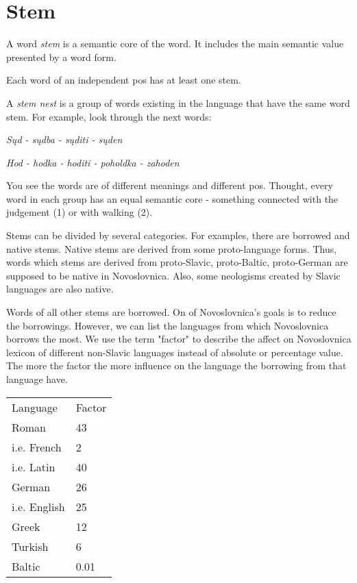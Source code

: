 \section{Stem}

A word \textit{stem} is a semantic core of the word. It includes the main semantic value presented by a word form.

Each word of an independent \gls{pos} has at least one stem.

A \textit{stem nest} is a group of words existing in the language that have the same word stem. For example, look through the next words:

\textit{Sųd - sųdba - sųditi - sųden}

\textit{Hod - hodka - hoditi - poholdka - zahoden}

You see the words are of different meanings and different \gls{pos}. Thought, every word in each group has an equal semantic core - something connected with the judgement (1) or with walking (2).

Stems can be divided by several categories. For examples, there are borrowed and native stems. Native stems are derived from some proto-language forms. Thus, words which stems are derived from proto-Slavic, proto-Baltic, proto-German are supposed to be native in Novoslovnica. Also, some neologisms created by Slavic languages are also native.

Words of all other stems are borrowed. On of Novoslovnica's goals is to reduce the borrowings. However, we can list the languages from which Novoslovnica borrows the most. We use the term "factor" to describe the affect on Novoslovnica lexicon of different non-Slavic languages instead of absolute or percentage value. The more the factor the more influence on the language the borrowing from that language have.

\begin{table}[!htb]
	\begin{tabular}{ll}
		Language & Factor \\
		Roman & 43 \\
		i.e. French & 2 \\
		i.e. Latin & 40 \\
		German & 26 \\
		i.e. English & 25 \\
		Greek & 12 \\ 
		Turkish & 6 \\
		Baltic & 0.01 \\
	\end{tabular}
\end{table}

